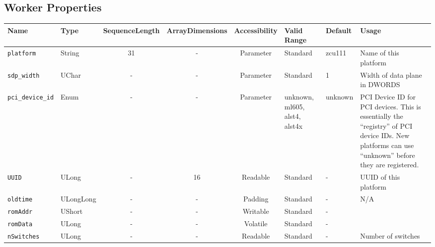\documentclass{article}
\begin{document}
\begin{landscape}
	\section{Worker Properties}
	\begin{scriptsize}
		\begin{tabular}{|p{3cm}|p{1.5cm}|c|c|c|p{1.5cm}|p{1cm}|p{6cm}|}
			\hline
			\rowcolor{blue}
			Name               & Type   & SequenceLength & ArrayDimensions & Accessibility      & Valid Range & Default & Usage                                                                         \\
			\hline
			\verb+platform+    & String & 31             & -               & Parameter & Standard & zcu111 & Name of this platform                                                     \\
			\hline
			\verb+sdp_width+   & UChar  & -              & -               & Parameter & Standard & 1 & Width of data plane in DWORDS                                             \\
			\hline
			\verb+pci_device_id+ & Enum & -              & -               & Parameter & unknown, ml605, alst4, alst4x & unknown & PCI Device ID for PCI devices. This is essentially the ``registry'' of PCI device IDs. New platforms can use ``unknown'' before they are registered. \\
			\hline
			\verb+UUID+        & ULong  & -              & 16              & Readable           & Standard    & -       & UUID of this platform                                                         \\
			\hline
			\verb+oldtime+     & ULongLong & -           & -               & Padding            & Standard    & -       & N/A                                                                           \\
			\hline
			\verb+romAddr+     & UShort & -              & -               & Writable           & Standard    & -       &                                                                               \\
			\hline
			\verb+romData+     & ULong  & -              & -               & Volatile           & Standard    & -       &                                                                               \\
			\hline
			\verb+nSwitches+   & ULong  & -              & -               & Readable           & Standard    & -       & Number of switches                                                            \\

\end{tabular}
\end{scriptsize}
\end{landscape}
\end{document}
